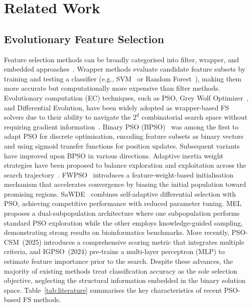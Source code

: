 \documentclass[a4paper,fleqn]{cas-dc}
\begin{document}
\begin{sloppypar}

	\section{Related Work}
	\label{sec:related}

	\subsection{Evolutionary Feature Selection}
	\label{sec:related:evofs}

	\par{
	Feature selection methods can be broadly categorised into filter,
	wrapper, and embedded approaches~\citep{guyon2003introduction,kohavi1997wrappers,yang2020feature,li2017feature}.
	Wrapper methods evaluate candidate feature subsets by training and
	testing a classifier (e.g., SVM~\citep{cortes1995support} or Random Forest~\citep{breiman2001random}), making them more accurate but computationally
	more expensive than filter methods.
	Evolutionary computation (EC) techniques, such as PSO, Grey Wolf
	Optimizer~\citep{mirjalili2014grey}, and Differential Evolution, have been widely adopted
	as wrapper-based FS solvers due to their ability to navigate the
	$2^d$ combinatorial search space without requiring gradient
	information~\citep{xue2012particle,rostami2022review,liu2023high,abd2020survey,agrawal2021feature}.
	Binary PSO (BPSO)~\citep{kennedy1997discrete,kennedy1995particle,shi1998modified} was among the first
	to adapt PSO for discrete optimisation, encoding feature subsets as
	binary vectors and using sigmoid transfer functions for position
	updates.
	Subsequent variants have improved upon BPSO in various directions.
	Adaptive inertia weight strategies have been proposed to balance
	exploration and exploitation across the search
	trajectory~\citep{zhang2015adaptive,wang2020improving,chen2020feature,zhang2019information}.
	FWPSO~\citep{huang2020enhanced} introduces a feature-weight-based
	initialisation mechanism that accelerates convergence by biasing
	the initial population toward promising regions.
	SaWDE~\citep{zhan2020sa} combines self-adaptive differential
	selection with PSO, achieving competitive performance with reduced
	parameter tuning.
	MEL~\citep{MEL_CITE} proposes a dual-subpopulation architecture
	where one subpopulation performs standard PSO exploration while the
	other employs knowledge-guided sampling, demonstrating strong
	results on bioinformatics benchmarks.
	More recently, PSO-CSM~(2025) introduces a comprehensive scoring
	metric that integrates multiple criteria, and IGPSO~(2024)
	pre-trains a multi-layer perceptron (MLP) to estimate feature
	importance prior to the search.
	Despite these advances, the majority of existing methods treat
	classification accuracy as the sole selection objective, neglecting
	the structural information embedded in the binary solution space.
	Table~\ref{tab:literature} summarises the key characteristics of
	recent PSO-based FS methods.
	}


\end{sloppypar}
\end{document}
